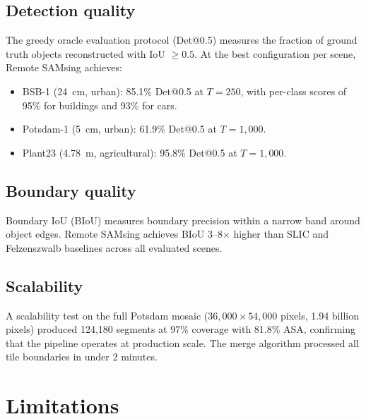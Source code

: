 \documentclass[review,11pt,authoryear]{elsarticle}
\begin{document}
\subsection{Detection quality}

The greedy oracle evaluation protocol (Det@0.5) measures the fraction of ground truth objects reconstructed with IoU $\geq 0.5$. At the best configuration per scene, Remote SAMsing achieves:
\begin{itemize}
    \item BSB-1 (24~cm, urban): 85.1\% Det@0.5 at $T = 250$, with per-class scores of 95\% for buildings and 93\% for cars.
    \item Potsdam-1 (5~cm, urban): 61.9\% Det@0.5 at $T = 1{,}000$.
    \item Plant23 (4.78~m, agricultural): 95.8\% Det@0.5 at $T = 1{,}000$.
\end{itemize}

\subsection{Boundary quality}

Boundary IoU (BIoU) \citep{cheng2021boundary} measures boundary precision within a narrow band around object edges. Remote SAMsing achieves BIoU 3--8$\times$ higher than SLIC \citep{achanta2012slic} and Felzenszwalb \citep{felzenszwalb2004efficient} baselines across all evaluated scenes.

\subsection{Scalability}

A scalability test on the full Potsdam mosaic ($36{,}000 \times 54{,}000$ pixels, 1.94 billion pixels) produced 124{,}180 segments at 97\% coverage with 81.8\% ASA, confirming that the pipeline operates at production scale. The merge algorithm processed all tile boundaries in under 2 minutes.


\section{Limitations}
\label{sec:limitations}
\end{document}
